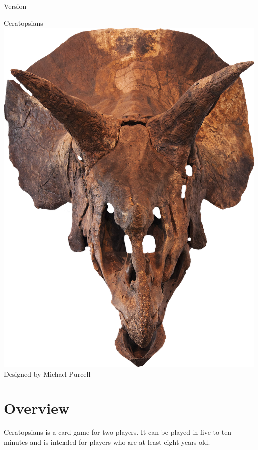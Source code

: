 \documentclass[a6paper, parskip=half, DIV=14, 10pt]{scrartcl}
\begin{document}
{%
\thispagestyle{empty}
		\enlargethispage{3.5\baselineskip} %
\setmainfont[Scale=1.0]{Tex Gyre Pagella}
\begin{center}
\makeatletter
{Version \@version}
\makeatother
\setmainfont[Scale=1.6]{Tex Gyre Pagella}

\Huge
Ceratopsians
\vfill{}
\includegraphics[scale=1.0]{Images/triceratops_skull_cropped2.png}
\vfill{}
\normalsize
Designed by Michael Purcell
\end{center}
}%

\newpage
\setmainfont{Tex Gyre Pagella}%
\raggedright%
\section*{Overview}
Ceratopsians is a card game for two players. It can be played in five to ten minutes and is intended for players who are at least eight years old.
\end{document}
